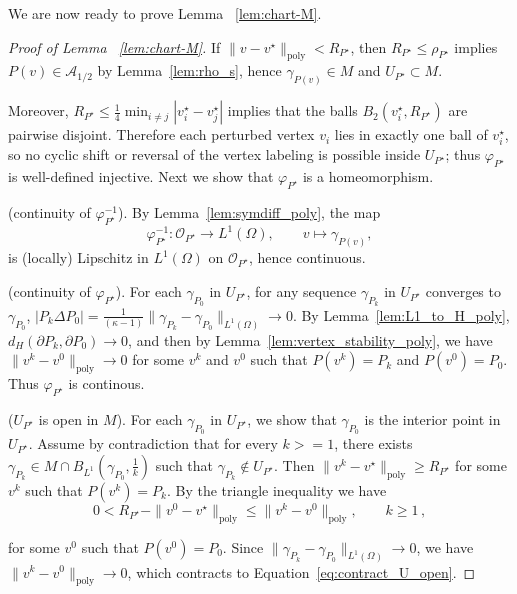 \documentclass{article}
\def\Eqref#1{Equation~\ref{#1}}
\begin{document}
We are now ready to prove Lemma ~\ref{lem:chart-M}. 
\begin{proof}[Proof of Lemma ~\ref{lem:chart-M}]

If $\|v-v^\star\|_{\mathrm{poly}}<R_{P^\star}$, then $R_{P^\star}\le \rho_{P^\star}$ implies $P(v)\in\mathcal A_{1/2}$
by Lemma~\ref{lem:rho_s}, hence $\gamma_{P(v)}\in M$ and $U_{P^\star}\subset M$. 

Moreover, $R_{P^\star}\le \frac14\min_{i\neq j}|v_i^\star-v_j^\star|$ implies that the balls
$B_2(v_i^\star,R_{P^\star})$ are pairwise disjoint. Therefore each perturbed vertex $v_i$ lies in exactly one ball of $v_i^\star$,
so no cyclic shift or reversal of the vertex labeling is possible inside $U_{P^\star}$; thus $\varphi_{P^\star}$ is well-defined
injective.
Next we show that $\varphi_{P^\star}$ is a homeomorphism.

(continuity of $\varphi_{P^\star}^{-1}$).
By Lemma~\ref{lem:symdiff_poly}, the map
\[
\varphi_{P^\star}^{-1}:\mathcal O_{P^\star}\to L^1(\Omega),\qquad v\mapsto \gamma_{P(v)},
\]
is (locally) Lipschitz in $L^1(\Omega)$ on $\mathcal O_{P^\star}$, hence continuous.

(continuity of $\varphi_{P^\star}$).
For each $\gamma_{P_0}$  in $U_{P^\star}$, for any sequence $\gamma_{P_k}$ in $U_{P^\star}$ converges to $\gamma_{P_0}$, $|P_k \Delta P_0| = \frac{1}{(\kappa-1)}\|\gamma_{P_k}-\gamma_{P_0} \|_{L^1(\Omega)} \to 0$. By Lemma~\ref{lem:L1_to_H_poly}, $d_{H}(\partial P_k, \partial P_0)\to 0$, and then by Lemma~\ref{lem:vertex_stability_poly}, we have $\|v^{k} - v^0\|_{\mathrm{poly}} \to 0$ for some $v^k$ and $v^0$ such that $P(v^k)=P_k$ and $P(v^0)=P_0$. Thus  $\varphi_{P^\star}$ is continous. 

($U_{P^\star}$ is open in $M$).
For each $\gamma_{P_0}$  in $U_{P^\star}$, we show that $\gamma_{P_0}$ is the interior point in $U_{P^\star}$. Assume by contradiction that for every $k>=1$, there exists $\gamma_{P_k} \in M \cap B_{L^1}(\gamma_{P_0}, \frac{1}{k})$ such that  $\gamma_{P_k} \notin U_{P^\star}$. Then $\|v^k-v^\star\|_{\mathrm{poly}}\geq R_{P^\star}$ for some $v^k$ such that $P(v^k) = P_k$. By the triangle inequality we have
\begin{equation}
\label{eq:contract_U_open}
    0 < R_{P^\star} - \|v^0-v^\star\|_{\mathrm{poly}} \leq \|v^k-v^0\|_{\mathrm{poly}}, \qquad k\geq 1 \,,
\end{equation}


for some $v^0$ such that $P(v^0) = P_0$. Since $\|\gamma_{P_k}-\gamma_{P_0} \|_{L^1(\Omega)} \to 0$, we have $\|v^k-v^0\|_{\mathrm{poly}} \to 0$, which contracts to \Eqref{eq:contract_U_open}.
\end{proof}
\end{document}
